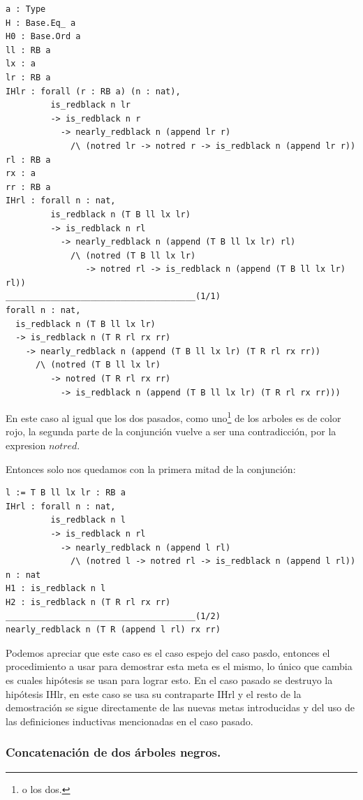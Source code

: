\documentclass[8pt,leqno,pdflatex,spanish]{book}
\theoremstyle{plain}
\theoremstyle{definition}
\theoremstyle{remark}
\begin{document}
\begin{verbatim}
a : Type
H : Base.Eq_ a
H0 : Base.Ord a
ll : RB a
lx : a
lr : RB a
IHlr : forall (r : RB a) (n : nat),
         is_redblack n lr
         -> is_redblack n r
           -> nearly_redblack n (append lr r)
             /\ (notred lr -> notred r -> is_redblack n (append lr r))
rl : RB a
rx : a
rr : RB a
IHrl : forall n : nat,
         is_redblack n (T B ll lx lr)
         -> is_redblack n rl
           -> nearly_redblack n (append (T B ll lx lr) rl)
             /\ (notred (T B ll lx lr)
                -> notred rl -> is_redblack n (append (T B ll lx lr) rl))
______________________________________(1/1)
forall n : nat,
  is_redblack n (T B ll lx lr)
  -> is_redblack n (T R rl rx rr)
    -> nearly_redblack n (append (T B ll lx lr) (T R rl rx rr))
      /\ (notred (T B ll lx lr)
         -> notred (T R rl rx rr)
           -> is_redblack n (append (T B ll lx lr) (T R rl rx rr)))
\end{verbatim}

En este caso al igual que los dos pasados, como uno\footnote{o los dos.} de los arboles es de 
color rojo, la segunda parte de la conjunci\'on vuelve a ser una contradicci\'on, por la expresion 
$notred$.

Entonces solo nos quedamos con la primera mitad de la conjunci\'on:

\begin{verbatim}
l := T B ll lx lr : RB a
IHrl : forall n : nat,
         is_redblack n l
         -> is_redblack n rl
           -> nearly_redblack n (append l rl)
             /\ (notred l -> notred rl -> is_redblack n (append l rl))
n : nat
H1 : is_redblack n l
H2 : is_redblack n (T R rl rx rr)
______________________________________(1/2)
nearly_redblack n (T R (append l rl) rx rr)
\end{verbatim}

Podemos apreciar que este caso es el caso espejo del caso pasdo, entonces el procedimiento a usar 
para demostrar esta meta es el mismo, lo \'unico que cambia es cuales hip\'otesis se usan para 
lograr esto. En el caso pasado se destruyo la hip\'otesis IHlr, en este caso se usa su contraparte 
IHrl y el resto de la demostraci\'on se sigue directamente de las nuevas metas introducidas y del 
uso de las definiciones inductivas mencionadas en el caso pasado.

\subsubsection{Concatenaci\'on de dos \'arboles negros.}
\end{document}
